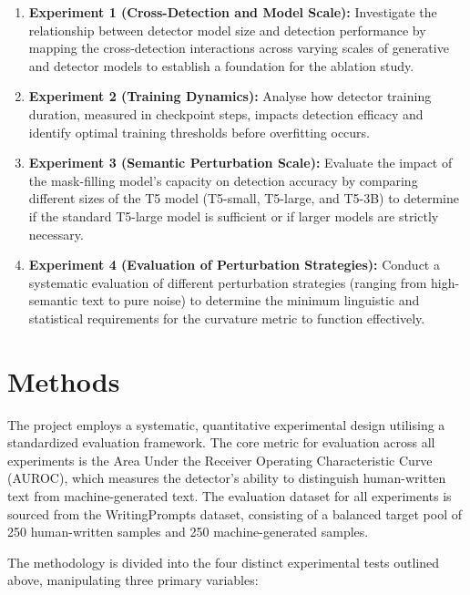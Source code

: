 \documentclass[a4paper,11pt]{article}
\begin{document}
\begin{enumerate}
    \item \textbf{Experiment 1 (Cross-Detection and Model Scale):} Investigate the relationship between detector model size and detection performance by mapping the cross-detection interactions across varying scales of generative and detector models to establish a foundation for the ablation study.
    \item \textbf{Experiment 2 (Training Dynamics):} Analyse how detector training duration, measured in checkpoint steps, impacts detection efficacy and identify optimal training thresholds before overfitting occurs.
    \item \textbf{Experiment 3 (Semantic Perturbation Scale):} Evaluate the impact of the mask-filling model's capacity on detection accuracy by comparing different sizes of the T5 model (T5-small, T5-large, and T5-3B) to determine if the standard T5-large model is sufficient or if larger models are strictly necessary.
    \item \textbf{Experiment 4 (Evaluation of Perturbation Strategies):} Conduct a systematic evaluation of different perturbation strategies (ranging from high-semantic text to pure noise) to determine the minimum linguistic and statistical requirements for the curvature metric to function effectively.
\end{enumerate}

\section{Methods}
The project employs a systematic, quantitative experimental design utilising a standardized evaluation framework. The core metric for evaluation across all experiments is the Area Under the Receiver Operating Characteristic Curve (AUROC), which measures the detector's ability to distinguish human-written text from machine-generated text. The evaluation dataset for all experiments is sourced from the WritingPrompts dataset, consisting of a balanced target pool of 250 human-written samples and 250 machine-generated samples.

The methodology is divided into the four distinct experimental tests outlined above, manipulating three primary variables:
\end{document}
